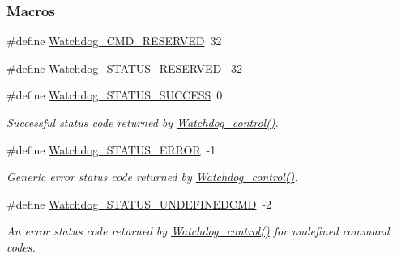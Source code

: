 \subsubsection*{Macros}
\begin{DoxyCompactItemize}
\item 
\#define \hyperlink{_watchdog_8h_a4d1b16e67bf555b8fe49182eb8a28b97}{Watchdog\+\_\+\+C\+M\+D\+\_\+\+R\+E\+S\+E\+R\+V\+E\+D}~32
\item 
\#define \hyperlink{_watchdog_8h_af7d1273929fd4d1f630c31b90def9684}{Watchdog\+\_\+\+S\+T\+A\+T\+U\+S\+\_\+\+R\+E\+S\+E\+R\+V\+E\+D}~-\/32
\item 
\#define \hyperlink{_watchdog_8h_aa8dd490de97398b1da33798d8e54b53f}{Watchdog\+\_\+\+S\+T\+A\+T\+U\+S\+\_\+\+S\+U\+C\+C\+E\+S\+S}~0
\begin{DoxyCompactList}\small\item\em Successful status code returned by \hyperlink{_watchdog_8h_aa98a75361edb1e476432669169f2950e}{Watchdog\+\_\+control()}. \end{DoxyCompactList}\item 
\#define \hyperlink{_watchdog_8h_a7cc28c1119ebecae88a5ae0735228489}{Watchdog\+\_\+\+S\+T\+A\+T\+U\+S\+\_\+\+E\+R\+R\+O\+R}~-\/1
\begin{DoxyCompactList}\small\item\em Generic error status code returned by \hyperlink{_watchdog_8h_aa98a75361edb1e476432669169f2950e}{Watchdog\+\_\+control()}. \end{DoxyCompactList}\item 
\#define \hyperlink{_watchdog_8h_a589be79a7f8ce642863f231e1dae7577}{Watchdog\+\_\+\+S\+T\+A\+T\+U\+S\+\_\+\+U\+N\+D\+E\+F\+I\+N\+E\+D\+C\+M\+D}~-\/2
\begin{DoxyCompactList}\small\item\em An error status code returned by \hyperlink{_watchdog_8h_aa98a75361edb1e476432669169f2950e}{Watchdog\+\_\+control()} for undefined command codes. \end{DoxyCompactList}\end{DoxyCompactItemize}
